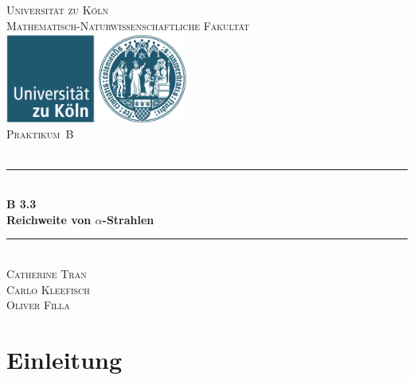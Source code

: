 \documentclass[12pt,a4paper]{scrartcl}
\numberwithin{equation}{section} %
\newcommand{\HRule}{\rule{\linewidth}{0.7mm}}
\renewcommand{\[}{} %
\renewcommand{\]}{\noindent} %
\begin{document}
\begin{titlepage}
	\pagestyle{empty}

	\begin{center}

	\textsc{\LARGE Universität zu Köln }\\ [0.4cm]
	\textsc{Mathematisch-Naturwissenschaftliche Fakultät} \\[1.5cm]

	\includegraphics[width=0.45\textwidth]{../media/uni.jpg}\\[1.5cm]  %

	\textsc{\Large Praktikum~B}\\[2mm]
	\textsc{}\\[10mm]
	\HRule \\[0.4cm]

		{	\Huge \bfseries B 3.3}\\[0.4cm]
			{	\huge \bfseries Reichweite von \(\alpha\)-Strahlen}\\[0.3cm]
	
	\HRule \\[3cm]

			\textsc{\Large Catherine Tran } \\[3pt]
		\textsc{\Large Carlo Kleefisch } \\[3pt]
		\textsc{\Large Oliver Filla } \\[3pt]
		
	\end{center}
\end{titlepage}

\newpage
\tableofcontents
\newpage

\hypertarget{einleitung}{%
\section{Einleitung}\label{einleitung}}
\end{document}
